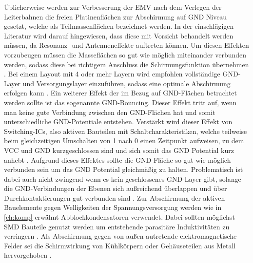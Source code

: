 Üblicherweise werden zur Verbesserung der EMV nach dem Verlegen der Leiterbahnen die freien Platinenflächen zur Abschirmung auf GND Niveau gesetzt, welche als Teilmassenflächen bezeichnet werden. In der einschlägigen Literatur wird darauf hingewiesen, dass diese mit Vorsicht behandelt werden müssen, da Resonanz- und Antenneneffekte auftreten können. Um diesen Effekten vorzubeugen müssen die Masseflächen so gut wie möglich miteinander verbunden werden, sodass diese bei richtigem Anschluss die Schirmungsfunktion übernehmen \cite[S.166]{Franz2012}. Bei einem Layout mit 4 oder mehr Layern wird empfohlen vollständige GND-Layer und Versorgungslayer einzuführen, sodass eine optimale Abschirmung erfolgen kann \cite[S.172]{Franz2012}. Ein weiterer Effekt der im Bezug auf GND-Flächen betrachtet werden sollte ist das sogenannte GND-Bouncing. Dieser Effekt tritt auf, wenn man keine gute Verbindung zwischen den GND-Flächen hat und somit unterschiedliche GND-Potentiale entstehen. Verstärkt wird dieser Effekt von Switching-ICs, also aktiven Bauteilen mit Schaltcharakteristiken, welche teilweise beim gleichzeitigen Umschalten von 1 nach 0 einen Zeitpunkt aufweisen, zu dem VCC und GND kurzgeschlossen sind und sich somit das GND Potential kurz anhebt \cite[S.1]{gndbnc}. Aufgrund dieses Effektes sollte die GND-Fläche so gut wie möglich verbunden sein um das GND Potential gleichmäßig zu halten. Problematisch ist dabei auch nicht zwingend wenn es kein geschlossenes GND-Layer gibt, solange die GND-Verbindungen der Ebenen sich außreichend überlappen und über Durchkontaktierungen gut verbunden sind \cite[S.172]{Franz2012}. Zur Abschirmung der aktiven Bauelemente gegen Welligkeiten der Spannungsversorgung werden wie in \autoref{ch:komp} erwähnt Abblockkondensatoren verwendet. Dabei sollten möglichst SMD Bauteile genutzt werden um entstehende parasitäre Induktivitäten zu verringern \cite[S.34]{emcdes}. Als Abschirmung gegen von außen autretende elektromagnetische Felder sei die Schirmwirkung von Kühlkörpern oder Gehäuseteilen aus Metall hervorgehoben \cite[S.22]{Franz2012}.

